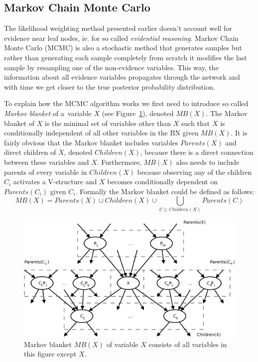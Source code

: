 \documentclass[english,cover]{fitthesis} %
\newcommand{\term}[1]{\emph{#1}}           %
\begin{document}
\subsection{Markov Chain Monte Carlo}
The likelihood weighting method presented earlier doesn't account well for evidence near leaf nodes, ie. for so called \term{evidential reasoning}. Markov Chain Monte Carlo (MCMC) is also a stochastic method that generates samples but rather than generating each sample completely from scratch it modifies the last sample by resampling one of the non-evidence variables. This way, the information about all evidence variables propagates through the network and with time we get closer to the true posterior probability distribution.

To explain how the MCMC algorithm works we first need to introduce so called \term{Markov blanket} of a~variable $X$ (see Figure~\ref{fig:bn-markov-blanket}), denoted $MB(X)$. The Markov blanket of $X$ is the minimal set of variables other than $X$ such that $X$ is conditionally independent of all other variables in the BN given $MB(X)$. It is fairly obvious that the Markov blanket includes variables $Parents(X)$ and direct children of $X$, denoted $Children(X)$, because there is a direct connection between these variables and $X$. Furthermore, $MB(X)$ also needs to include parents of every variable in $Children(X)$ because observing any of the children $C_i$ activates a V-structure and $X$ becomes conditionally dependent on $Parents(C_i)$ given $C_i$. Formally the Markov blanket could be defined as follows:
\begin{equation*}
MB(X) = Parents(X) \cup Children(X) \cup \!\!\!\!\!\!\!\! \bigcup_{C \in Children(X)} \!\!\!\!\!\!\!\!\!\!\!\! Parents(C)
\end{equation*}

\begin{center}
\begin{figure}[h]
    \begin{center}
    \includegraphics[scale=0.4]{fig/bn-markov_blanket}
    \end{center}
    \caption{Markov blanket $MB(X)$ of variable $X$ consists of all variables in this figure except $X$.}
    \label{fig:bn-markov-blanket}
\end{figure}
\end{center}
\end{document}
